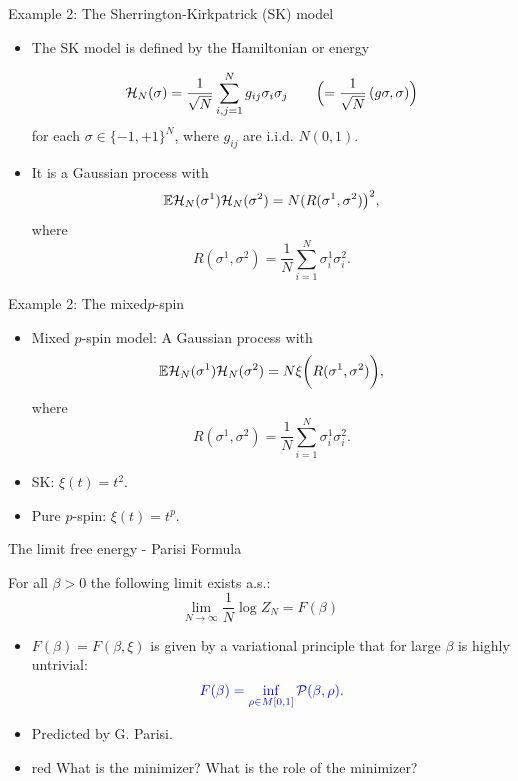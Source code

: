 \documentclass[handout]{beamer}
\def\H{{\cal H}}
\newcommand{\e}{\mathbb{E}}
\begin{document}
\begin{frame}{Example 2: The Sherrington-Kirkpatrick (SK) model}

\begin{itemize}
	\item The SK model is defined by the Hamiltonian or energy
	
	\begin{align*}
	\mathcal \H_N(\sigma)=\frac{1}{\sqrt{N}}\sum_{i,j=1}^Ng_{ij}\sigma_i\sigma_j\qquad\Bigl(=\frac{1}{\sqrt{N}}\left(g\sigma,\sigma\right)\Bigr)
	\end{align*}
    for each $\sigma\in\{-1,+1\}^N$, where
	$g_{ij}$ are i.i.d. $N(0,1)$.
			
\item It is a Gaussian process with
	 	$$
	 	\e \H_N(\sigma^1)\H_N(\sigma^2)=N(R(\sigma^1,\sigma^2)\bigr)^2,
	 	$$
	 	where
	 	$$R(\sigma^1,\sigma^2)=\frac{1}{N}\sum_{i=1}^N\sigma_i^1\sigma_i^2.$$
	 				
\end{itemize}
	

\end{frame}




\begin{frame}{Example 2: The mixed$p$-spin}

\begin{itemize}
\item Mixed $p$-spin model: A Gaussian process with
	 	$$
	 	\e \H_N(\sigma^1)\H_N(\sigma^2)=N \xi\bigg(R(\sigma^1,\sigma^2)\bigg),
	 	$$
	 	where
	 	$$R(\sigma^1,\sigma^2)=\frac{1}{N}\sum_{i=1}^N\sigma_i^1\sigma_i^2.$$
	 				\item SK: $\xi(t)=t^{2}$. 
				  	\item Pure $p$-spin: $\xi(t)=t^{p}$.
\end{itemize}

\end{frame}




\begin{frame}{The limit free energy - Parisi Formula}
\begin{theorem}
For all $\beta > 0$ the following limit exists a.s.:
\[
\lim_{N \rightarrow \infty} \frac{1}{N} \log Z_N = F(\beta)
\]
\end{theorem}
\begin{itemize}
\item $F(\beta)=F(\beta, \xi)$ is given by a variational principle that for large $\beta$ is highly untrivial:
\begin{equation*}
\begin{color}{blue}F(\beta) = \inf_{\rho \in M[0,1]} \mathcal P(\beta,\rho). \end{color}
\end{equation*}
\item Predicted by G. Parisi. 
\item \begin{color}{red}  What is the minimizer? What is the role of the minimizer? \end{color}
\end{itemize}
\end{frame}
\end{document}
